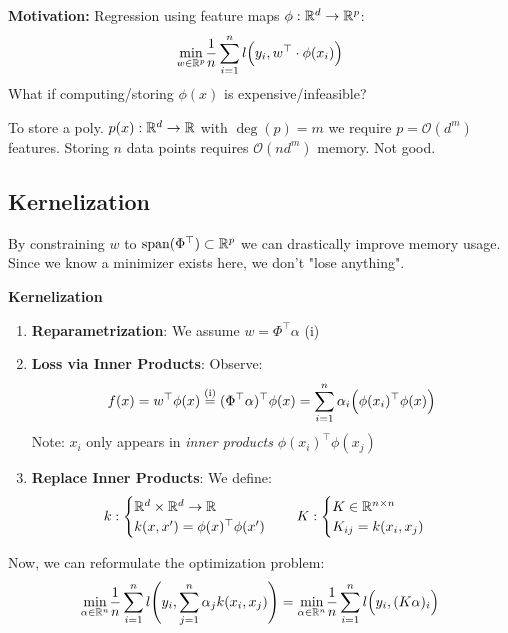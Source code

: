 \textbf{Motivation:} Regression using feature maps $\phi: \mathbb{R}^d \to \mathbb{R}^p$:
$$
    \underset{w \in \mathbb{R}^p}{\min}\frac{1}{n}\sum_{i=1}^{n}l\Bigl( y_i, w^\top \cdot \phi(x_i) \Bigr)
$$
What if computing/storing $\phi(x)$ is expensive/infeasible?\\

{\scriptsize
    \remark To store a poly. $p(x): \mathbb{R}^d \to \mathbb{R}$ with $\deg(p)=m$ we require $p=\mathcal{O}(d^m)$ features. Storing $n$ data points requires $\mathcal{O}(nd^m)$ memory. Not good.
}

\subsection{Kernelization}

By constraining $w$ to $\text{span}(\Phi^\top) \subset \mathbb{R}^p$ we can drastically improve memory usage. Since we know a minimizer exists here, we don't "lose anything".

 \textbf{Kernelization}

\begin{enumerate}
    \item \textbf{Reparametrization}: We assume $w = \Phi^\top\alpha$ (i)
    \item \textbf{Loss via Inner Products}: Observe:
    $$
        f(x) = w^\top \phi(x) \overset{\text{(i)}}{=} (\Phi^\top \alpha)^\top \phi(x) = \sum_{i=1}^{n} \alpha_i \Bigl( \phi(x_i)^\top \phi(x) \Bigr)
    $$
    Note: $x_i$ only appears in \textit{inner products} $\phi(x_i)^\top \phi(x_j)$
    \item \textbf{Replace Inner Products}: We define:
    $$
        k:\begin{cases}
            \mathbb{R}^d\times\mathbb{R}^d\to\mathbb{R} \\
            k(x,x') = \phi(x)^\top \phi(x')
        \end{cases}
        \quad
        K:\begin{cases}
            K \in \mathbb{R}^{n\times n} \\
            K_{ij} = k(x_i,x_j)
        \end{cases}
    $$
\end{enumerate}

Now, we can reformulate the optimization problem:
$$
    \underset{\alpha\in\mathbb{R}^n}{\min}\frac{1}{n}\sum_{i=1}^{n}l\Biggl( y_i, \sum_{j=1}^{n}\alpha_j k(x_i,x_j) \Biggr) = \underset{\alpha\in\mathbb{R}^n}{\min}\frac{1}{n}\sum_{i=1}^{n}l\Bigl( y_i, (K\alpha)_i \Bigr)
$$

